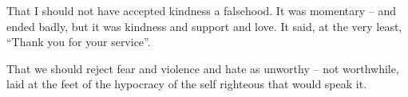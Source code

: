 

That I should not have accepted kindness a falsehood.  It was
momentary -- and ended badly, but it was kindness and support and
love.  It said, at the very least, ``Thank you for your service''.

That we should reject fear and violence and hate as unworthy -- not
worthwhile, laid at the feet of the hypocracy of the self righteous
that would speak it.

\bye
